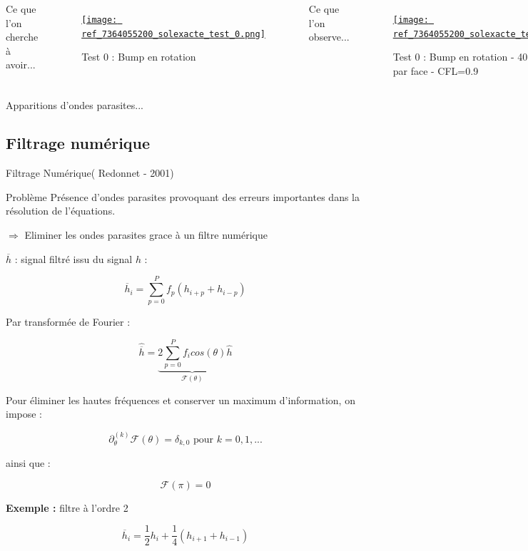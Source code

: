\documentclass[11pt]{beamer}
\begin{document}
\begin{frame}
\begin{columns}
Ce que l'on cherche à avoir...

\begin{figure}
\href{run:ref_7364055200_test_0.avi}{\texttt{[image: ref\_7364055200\_solexacte\_test\_0.png]}} 
\caption{Test 0 : Bump en rotation}
\end{figure}

Ce que l'on observe...

\begin{figure}
\href{run:ref_7363895058_test_0.avi}{\texttt{[image: ref\_7364055200\_solexacte\_test\_0.png]}} 
\caption{Test 0 : Bump en rotation - 40 mailles par face - CFL=0.9}
\end{figure}
\end{columns}

\pause
\begin{alertblock}{}
Apparitions d'ondes parasites...
\end{alertblock}
\end{frame}




\subsection{Filtrage numérique}
\begin{frame}{Filtrage Numérique( Redonnet - 2001)}
\begin{alertblock}{Problème}
Présence d'ondes parasites provoquant des erreurs importantes dans la
résolution de l'équations.

$\Rightarrow$ Eliminer les ondes parasites grace à un filtre numérique
\end{alertblock}

$\overline{h}$ : signal filtré issu du signal $h$ :

$$\overline{h}_i = \sum_{p=0}^P f_p \left( h_{i+p} + h_{i-p} \right)$$

Par transformée de Fourier :

$$\hat{\overline{h}} = \underbrace{2 \sum_{p=0}^P f_i cos(\theta)}_{\mathcal{F}(\theta)} \hat{h}$$

\end{frame}

\begin{frame}
Pour éliminer les hautes fréquences et conserver un maximum
d'information, on impose :

$$\partial_{\theta}^{(k)}\mathcal{F} ( \theta ) = \delta_{k,0} \text{ pour } k=0,1,...$$

ainsi que :

$$\mathcal{F} ( \pi ) = 0$$

\textbf{Exemple :} filtre à l'ordre 2

$$\overline{h}_i = \dfrac{1}{2}h_i + \dfrac{1}{4}\left( h_{i+1} +
h_{i-1} \right) $$

\end{frame}
\end{document}
